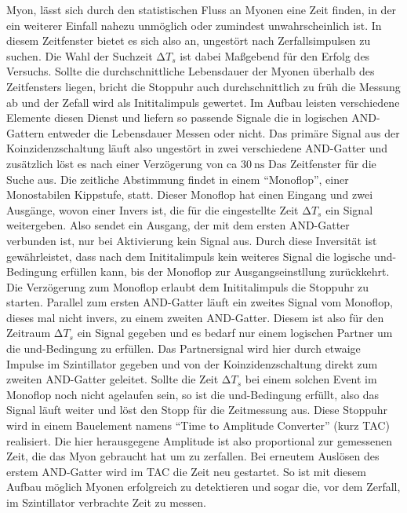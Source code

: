 Myon, lässt sich durch den statistischen Fluss an Myonen eine Zeit finden, in der ein weiterer Einfall nahezu unmöglich oder zumindest unwahrscheinlich ist.
In diesem Zeitfenster bietet es sich also an, ungestört nach Zerfallsimpulsen zu suchen. Die Wahl der Suchzeit $\increment T_s$
ist dabei Maßgebend für den Erfolg des Versuchs. Sollte die durchschnittliche Lebensdauer der Myonen überhalb des Zeitfensters liegen, 
bricht die Stoppuhr auch durchschnittlich zu früh die Messung ab und der Zefall wird als Inititalimpuls gewertet. 
Im Aufbau leisten verschiedene Elemente diesen Dienst und liefern so passende Signale die in logischen AND-Gattern entweder die Lebensdauer Messen oder nicht.
Das primäre Signal aus der Koinzidenzschaltung läuft also ungestört in zwei verschiedene AND-Gatter und zusätzlich löst es nach einer Verzögerung von ca $\SI{30}{\nano\second}$
Das Zeitfenster für die Suche aus.
Die zeitliche Abstimmung findet in einem \enquote{Monoflop}, einer Monostabilen Kippstufe, statt. Dieser Monoflop
hat einen Eingang und zwei Ausgänge, wovon einer Invers ist, die für die eingestellte Zeit $\increment T_s$ ein Signal weitergeben. Also sendet ein Ausgang, der mit dem ersten AND-Gatter verbunden ist,
nur bei Aktivierung kein Signal aus. Durch diese Inversität ist gewährleistet, dass nach dem Inititalimpuls kein weiteres Signal die logische und-Bedingung erfüllen kann, bis 
der Monoflop zur Ausgangseinstllung zurückkehrt. Die Verzögerung zum Monoflop erlaubt dem Inititalimpuls die Stoppuhr zu starten. 
Parallel zum ersten AND-Gatter läuft ein zweites Signal vom Monoflop, dieses mal nicht invers, zu einem zweiten AND-Gatter.
Diesem ist also für den Zeitraum $\increment T_s$ ein Signal gegeben und es bedarf nur einem logischen Partner um die und-Bedingung zu erfüllen. 
Das Partnersignal wird hier durch etwaige Impulse im Szintillator gegeben und von der Koinzidenzschaltung direkt zum zweiten AND-Gatter geleitet.
Sollte die Zeit $\increment T_s$ bei einem solchen Event im Monoflop noch nicht agelaufen sein, so ist die und-Bedingung erfüllt,
also das Signal läuft weiter und löst den Stopp für die Zeitmessung aus.
Diese Stoppuhr wird in einem Bauelement namens \enquote{Time to Amplitude Converter} (kurz TAC) realisiert. 
Die hier herausgegene Amplitude ist also proportional zur gemessenen Zeit, die das Myon gebraucht hat um zu zerfallen. Bei erneutem Auslösen des erstem AND-Gatter wird 
im TAC die Zeit neu gestartet.
So ist mit diesem Aufbau möglich Myonen erfolgreich zu detektieren und sogar die, vor dem Zerfall, im Szintillator verbrachte Zeit zu messen.
